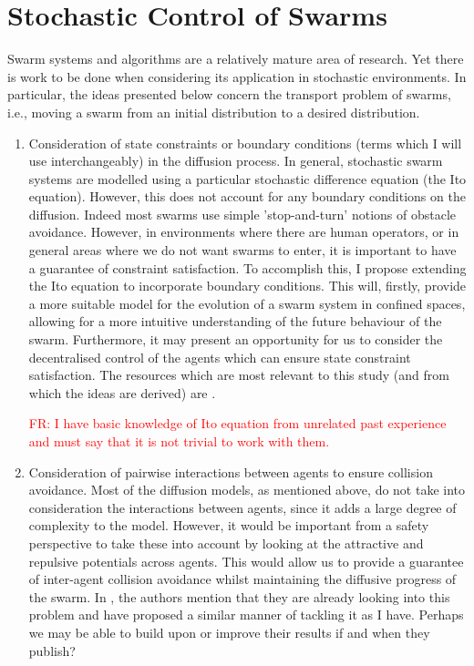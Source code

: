 \documentclass[preprint,11pt]{report}
\newcommand\fr[1]{\textcolor{red}{FR: #1}}
\begin{document}
\section{Stochastic Control of Swarms}

Swarm systems and algorithms are a relatively mature area of research. Yet there is work to be done
when considering its application in stochastic environments. In particular, the ideas presented
below concern the transport problem of swarms, i.e., moving a swarm from an initial distribution to a
desired distribution. 

\begin{enumerate}
	\item Consideration of state constraints or boundary
          conditions (terms which I will use interchangeably) in the
          diffusion process. In general, stochastic swarm systems are
          modelled using a particular stochastic difference equation
          (the Ito equation). However, this does not account for any
          boundary conditions on the diffusion. Indeed most swarms use
          simple 'stop-and-turn' notions of obstacle
          avoidance. However, in environments where there are human
          operators, or in general areas where we do not want swarms
          to enter, it is important to have a guarantee of constraint
          satisfaction. To accomplish this, I propose extending the
          Ito equation to incorporate boundary conditions. This will,
          firstly, provide a more suitable model for the evolution of
          a swarm system in confined spaces, allowing for a more
          intuitive understanding of the future behaviour of the
          swarm.  Furthermore, it may present an opportunity for us to
          consider the decentralised control of the agents which can
          ensure state constraint satisfaction. The resources which
          are most relevant to this study (and from which the ideas
          are derived) are
          \cite{Inoue2019,Sartoretti2014,Shahrokhi2019,Li2017}.

          \fr{I have basic knowledge of Ito equation from unrelated past experience and must say that it is not trivial to work with them.}

\item Consideration of pairwise interactions between agents to ensure
  collision avoidance. Most of the diffusion models, as mentioned
  above, do not take into consideration the interactions between
  agents, since it adds a large degree of complexity to the
  model. However, it would be important from a safety perspective to
  take these into account by looking at the attractive and repulsive
  potentials across agents. This would allow us to provide a guarantee
  of inter-agent collision avoidance whilst maintaining the diffusive
  progress of the swarm. In \cite{Inoue2019}, the authors mention that
  they are already looking into this problem and have proposed a
  similar manner of tackling it as I have. Perhaps we may be able to
  build upon or improve their results if and when they publish?


\end{enumerate}
\end{document}
